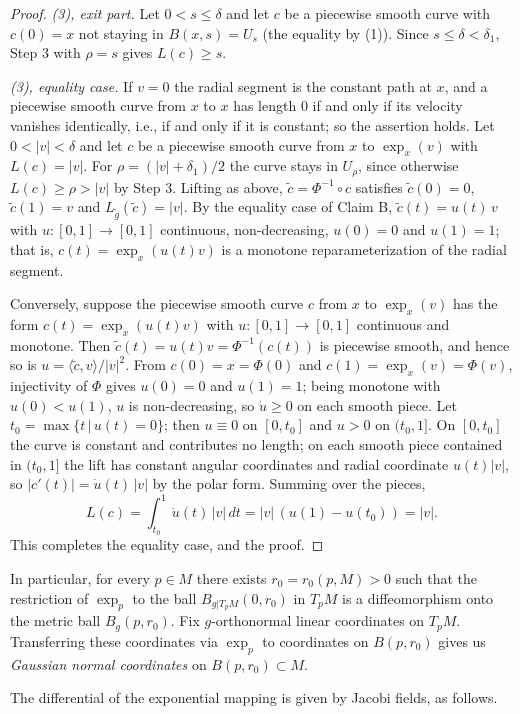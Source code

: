 \begin{proof}
\emph{(3), exit part.} Let $0<s\le\delta$ and let $c$ be a
piecewise smooth curve with $c(0)=x$ not staying in
$B(x,s)=U_s$ (the equality by (1)). Since $s\le\delta<\delta_1$,
Step 3 with $\rho=s$ gives $L(c)\ge s$.

\emph{(3), equality case.} If $v=0$ the radial segment is the
constant path at $x$, and a piecewise smooth curve from $x$ to $x$
has length $0$ if and only if its velocity vanishes identically,
i.e., if and only if it is constant; so the assertion holds. Let
$0<|v|<\delta$ and let $c$ be a piecewise smooth curve from $x$ to
$\exp_x(v)$ with $L(c)=|v|$. For $\rho=(|v|+\delta_1)/2$ the
curve stays in $U_\rho$, since otherwise $L(c)\ge\rho>|v|$ by
Step 3. Lifting as above, $\tilde c=\Phi^{-1}\circ c$ satisfies
$\tilde c(0)=0$, $\tilde c(1)=v$ and
$L_{\tilde g}(\tilde c)=|v|$. By the equality case of Claim B,
$\tilde c(t)=u(t)\,v$ with $u\colon[0,1]\to[0,1]$ continuous,
non-decreasing, $u(0)=0$ and $u(1)=1$; that is,
$c(t)=\exp_x(u(t)v)$ is a monotone reparameterization of the
radial segment.

Conversely, suppose the piecewise smooth curve $c$ from $x$ to
$\exp_x(v)$ has the form $c(t)=\exp_x(u(t)v)$ with
$u\colon[0,1]\to[0,1]$ continuous and monotone. Then
$\tilde c(t)=u(t)v=\Phi^{-1}(c(t))$ is piecewise smooth, and hence
so is $u=\langle\tilde c,v\rangle/|v|^2$. From $c(0)=x=\Phi(0)$
and $c(1)=\exp_x(v)=\Phi(v)$, injectivity of $\Phi$ gives $u(0)=0$
and $u(1)=1$; being monotone with $u(0)<u(1)$, $u$ is
non-decreasing, so $\dot u\ge0$ on each smooth piece. Let
$t_0=\max\{t\,|\,u(t)=0\}$; then $u\equiv0$ on $[0,t_0]$ and $u>0$
on $(t_0,1]$. On $[0,t_0]$ the curve is constant and contributes
no length; on each smooth piece contained in $(t_0,1]$ the lift
has constant angular coordinates and radial coordinate $u(t)|v|$,
so $|c'(t)|=\dot u(t)\,|v|$ by the polar form. Summing over the
pieces,
$$L(c)=\int_{t_0}^1\dot u(t)\,|v|\,dt=|v|\,(u(1)-u(t_0))=|v|.$$
This completes the equality case, and the proof.
\end{proof}

In particular, for every $p\in M$ there exists
$r_0=r_{0}(p,M)>0$ such that the restriction of $\exp_p$ to the
ball $B_{g|T_pM}(0,r_0)$ in $T_pM$ is a diffeomorphism onto the
metric ball $B_g(p,r_0)$. Fix $g$-orthonormal linear coordinates
on $T_pM$. Transferring these coordinates via $\exp_p$ to
coordinates on $B(p,r_0)$ gives us {\sl Gaussian normal
coordinates} on $B(p,r_0)\subset M$.

The differential of the exponential mapping is given by Jacobi
fields, as follows.

